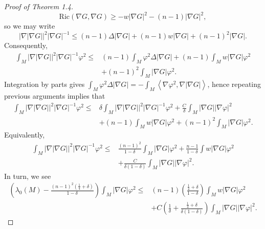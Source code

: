 \documentclass{amsart}
\theoremstyle{definition}
\theoremstyle{remark}
\numberwithin{equation}{section}
\begin{document}
\begin{proof}[Proof of Theorem 1.4]
\begin{equation*}
\text{Ric}(\nabla G,\nabla G)\geq -w|\nabla G|^2-(n-1)|\nabla G|^2,
\end{equation*}
so we may write 
\begin{equation*}
|\nabla|\nabla G||^2|\nabla G|^{-1}\leq (n-1)\Delta |\nabla G|+(n-1)w|\nabla G|+(n-1)^2|\nabla G|.
\end{equation*}
Consequently,
\begin{align*}
\int_M |\nabla|\nabla G||^2|\nabla G|^{-1}\varphi^2\leq &(n-1)\int_M\varphi^2\Delta|\nabla G|+(n-1)\int_M w|\nabla G|\varphi^2\\
&+(n-1)^2\int_M|\nabla G|\varphi^2.
\end{align*}
Integration by parts gives $\int_M\varphi^2\Delta|\nabla G|=-\int_M\left<\nabla \varphi^2,\nabla|\nabla G|\right>$, hence repeating previous arguments implies that
\begin{align*}
\int_M |\nabla|\nabla G||^2|\nabla G|^{-1}\varphi^2\leq& \delta\int_M|\nabla|\nabla G||^2|\nabla G|^{-1}\varphi^2+\frac{C}{\delta}\int_M|\nabla G||\nabla \varphi|^2\\
&+(n-1)\int_Mw|\nabla G|\varphi^2+(n-1)^2\int_M|\nabla G|\varphi^2.
\end{align*}
Equivalently,
\begin{align*}
\int_M|\nabla|\nabla G||^2|\nabla G|^{-1}\varphi^2\leq &\frac{(n-1)^2}{1-\delta}\int_M|\nabla G|\varphi^2+\frac{n-1}{1-\delta}\int w|\nabla G|\varphi^2\\
&+\frac{C}{\delta(1-\delta)}\int_M|\nabla G||\nabla \varphi|^2.
\end{align*}
In turn, we see
\begin{align*}
        \left(\lambda_0(M)-\frac{(n-1)^2\left(\frac{1}{4}+\delta\right)}{1-\delta}\right)\int_M|\nabla G|\varphi^2  \leq &(n-1)\left(\frac{\frac{1}{4}+\delta}{1-\delta}\right)\int_M w|\nabla G|\varphi^2\\
        &+C\left(\frac{1}{\delta}+\frac{\frac{1}{4}+\delta}{\delta(1-\delta)}\right)\int_M|\nabla G||\nabla \varphi|^2.
\end{align*}


\end{proof}
\end{document}
